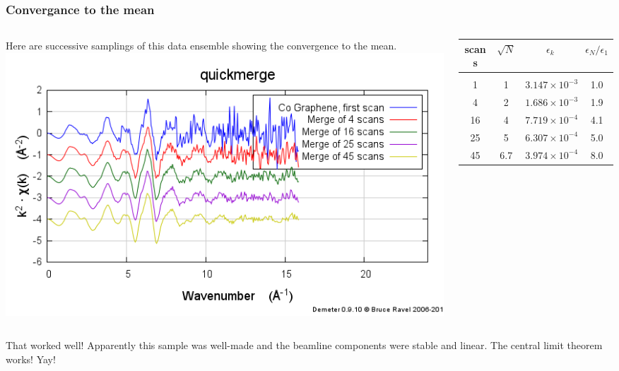 \documentclass[10pt, xcolor=x11names, compress]{beamer}
\begin{document}
\begin{frame}
  \frametitle{Convergance to the mean}
  \begin{columns}
    \begin{column}{0.5\linewidth}
      Here are successive samplings of this data ensemble showing the
      convergence to the mean. \\
      \includegraphics[width=\linewidth]{images/CoGr.png}
    \end{column}
    \begin{column}{0.5\linewidth}
      \small
      \begin{tabular}[h]{cccc}
        scans & $\sqrt{N}$ & $\epsilon_k$ & $\epsilon_N/\epsilon_1$ \\
        \hline\\
        1   & 1   & $3.147\times 10^{-3}$ & 1.0 \\
        4   & 2   & $1.686\times 10^{-3}$ & 1.9 \\
        16  & 4   & $7.719\times 10^{-4}$ & 4.1 \\
        25  & 5   & $6.307\times 10^{-4}$ & 5.0 \\
        45  & 6.7 & $3.974\times 10^{-4}$ & 8.0
      \end{tabular}
    \end{column}
  \end{columns}
  \begin{exampleblock}{}
    That worked well!  Apparently this sample was well-made and the
    beamline components were stable and linear.  The central limit
    theorem works!  Yay!
  \end{exampleblock}
\end{frame}
\end{document}
